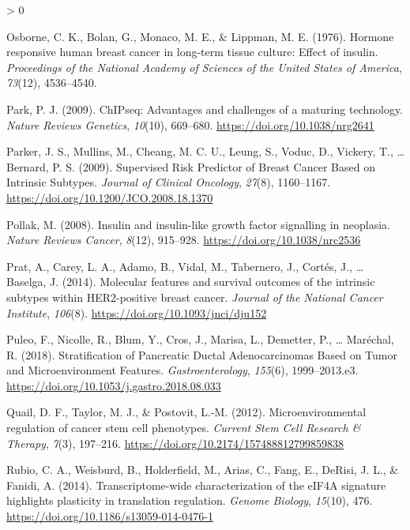 \documentclass[
  12pt,
  openany]{book}
\newlength{\cslhangindent}
\newenvironment{CSLReferences}[2] %
 {%
  \setlength{\parindent}{0pt}
  \ifodd #1 \everypar{\setlength{\hangindent}{\cslhangindent}}\ignorespaces\fi
  \ifnum #2 > 0
  \setlength{\parskip}{#2\baselineskip}
  \fi
 }%
 {}
\begin{document}
\begin{CSLReferences}{1}{0}
\leavevmode\hypertarget{ref-Osborne1976}{}%
Osborne, C. K., Bolan, G., Monaco, M. E., \& Lippman, M. E. (1976). Hormone responsive human breast cancer in long-term tissue culture: Effect of insulin. \emph{Proceedings of the National Academy of Sciences of the United States of America}, \emph{73}(12), 4536--4540.

\leavevmode\hypertarget{ref-Park2009}{}%
Park, P. J. (2009). {ChIP}{}seq: Advantages and challenges of a maturing technology. \emph{Nature Reviews Genetics}, \emph{10}(10), 669--680. \url{https://doi.org/10.1038/nrg2641}

\leavevmode\hypertarget{ref-Parker2009}{}%
Parker, J. S., Mullins, M., Cheang, M. C. U., Leung, S., Voduc, D., Vickery, T., \ldots{} Bernard, P. S. (2009). Supervised {Risk Predictor} of {Breast Cancer Based} on {Intrinsic Subtypes}. \emph{Journal of Clinical Oncology}, \emph{27}(8), 1160--1167. \url{https://doi.org/10.1200/JCO.2008.18.1370}

\leavevmode\hypertarget{ref-Pollak2008}{}%
Pollak, M. (2008). Insulin and insulin-like growth factor signalling in neoplasia. \emph{Nature Reviews Cancer}, \emph{8}(12), 915--928. \url{https://doi.org/10.1038/nrc2536}

\leavevmode\hypertarget{ref-Prat2014}{}%
Prat, A., Carey, L. A., Adamo, B., Vidal, M., Tabernero, J., Cortés, J., \ldots{} Baselga, J. (2014). Molecular features and survival outcomes of the intrinsic subtypes within {HER2}-positive breast cancer. \emph{Journal of the National Cancer Institute}, \emph{106}(8). \url{https://doi.org/10.1093/jnci/dju152}

\leavevmode\hypertarget{ref-Puleo2018}{}%
Puleo, F., Nicolle, R., Blum, Y., Cros, J., Marisa, L., Demetter, P., \ldots{} Maréchal, R. (2018). Stratification of {Pancreatic Ductal Adenocarcinomas Based} on {Tumor} and {Microenvironment Features}. \emph{Gastroenterology}, \emph{155}(6), 1999--2013.e3. \url{https://doi.org/10.1053/j.gastro.2018.08.033}

\leavevmode\hypertarget{ref-Quail2012}{}%
Quail, D. F., Taylor, M. J., \& Postovit, L.-M. (2012). Microenvironmental regulation of cancer stem cell phenotypes. \emph{Current Stem Cell Research \& Therapy}, \emph{7}(3), 197--216. \url{https://doi.org/10.2174/157488812799859838}

\leavevmode\hypertarget{ref-Rubio2014}{}%
Rubio, C. A., Weisburd, B., Holderfield, M., Arias, C., Fang, E., DeRisi, J. L., \& Fanidi, A. (2014). Transcriptome-wide characterization of the {eIF4A} signature highlights plasticity in translation regulation. \emph{Genome Biology}, \emph{15}(10), 476. \url{https://doi.org/10.1186/s13059-014-0476-1}


\end{CSLReferences}
\end{document}
